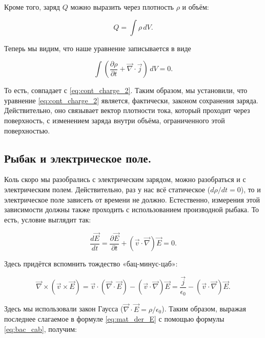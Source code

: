 \documentclass[a4paper,12pt]{article}
\numberwithin{equation}{section}
\newcommand{\pt}{\partial}
\newcommand{\eps}{\epsilon}
\newcommand{\vn}{\vec{\nabla}}
\begin{document}
Кроме того, заряд $Q$ можно выразить через плотность $\rho$ и объём: 

\begin{equation}
  \label{eq:phys_j_4}
  Q = \int \rho \, dV.
\end{equation}

Теперь мы видим, что наше уравнение записывается в виде 

\begin{equation}
  \label{eq:phys_j_5}
  \int \left( \frac{\pt \rho}{\pt t} + \vn \cdot \vec{j}  \right)\, dV
  = 0.
\end{equation}

То есть, совпадает с \eqref{eq:cont_charge_2}. Таким образом, мы
установили, что уравнение \eqref{eq:cont_charge_2} является,
фактически, законом сохранения заряда. Действительно, оно связывает
вектор плотности тока, который проходит через поверхность, с
изменением заряда внутри объёма, ограниченного этой поверхностью.

\subsection{Рыбак и электрическое поле.}
\label{sec:maxwell_eq_4}

Коль скоро мы разобрались с электрическим зарядом, можно разобраться и
с электрическим полем. Действительно, раз у нас всё статическое ($d\rho
/dt=0$), то и электрическое поле зависеть от времени не
должно. Естественно, измерения этой зависимости должны также проходить
с использованием производной рыбака. То есть, условие выглядит так: 

\begin{equation}
  \label{eq:mat_der_E}
  \frac{d\vec{E}}{dt} = \frac{\pt \vec{E}}{\pt t} + (\vec{v}\cdot \vn)
  \vec{E} = 0.
\end{equation}

Здесь придётся вспомнить тождество «бац-минус-цаб»: 

\begin{equation}
  \label{eq:bac_cab}
  \vn \times \left( \vec{v} \times \vec{E} \right) = \vec{v} \cdot (\vn
  \cdot \vec{E}) - (\vec{v}\cdot \vn) \vec{E} = \frac{\vec{j}}{\eps_0}  -
  (\vec{v}\cdot \vn) \vec{E}.
\end{equation}

Здесь мы использовали закон Гаусса ($\vn \cdot \vec{E} = \rho/\eps_0$). Таким образом, выражая последнее слагаемое в формуле
\eqref{eq:mat_der_E} с помощью формулы \eqref{eq:bac_cab}, получим: 
\end{document}
